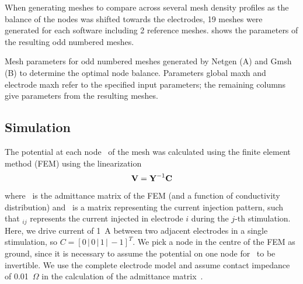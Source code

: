 When generating meshes to compare across several mesh density profiles as the balance of the nodes was shifted 
towards the electrodes, 19 meshes were generated for each software including 2 reference meshes. 
 shows the parameters of the resulting odd numbered meshes. 

\begin{table}[]
\caption[Parameters used to generate meshes]{\label{tab:mesh-table}Mesh parameters for odd numbered meshes generated by Netgen (A) and Gmsh (B) 
to determine the optimal 
node balance. Parameters global maxh and electrode maxh refer to the specified input parameters; the remaining 
columns give parameters from the resulting meshes.}

\end{table}

%
%
%

\subsection{Simulation}
The potential at each node \VB\ of the mesh was calculated using the finite
element method (FEM) using the linearization 
\begin{equation}
{\mbox{\bf V}} = {\mbox{\bf Y}}^{-1}{\mbox{\bf C}}
\end{equation}
where \YB\ is the admittance matrix of the FEM (and a function of conductivity
distribution) and \CB\ is a matrix representing the current injection pattern,
such that \CB$_{ij}$ represents the current injected in electrode $i$ during
the $j$-th stimulation. Here, we drive current of 1~A between two adjacent
electrodes in a single stimulation, so $C = [0\,|\,0\,|\,1\,|\,-1]^T$. 
We pick a node in the centre of the FEM as ground, since it is necessary to
assume the potential on
one node for \YB\ to be invertible.
We use the complete electrode model and assume contact impedance of
0.01~$\Omega$ in the calculation of the admittance
matrix~\parencite{polydorides_electrode_2002}. 

